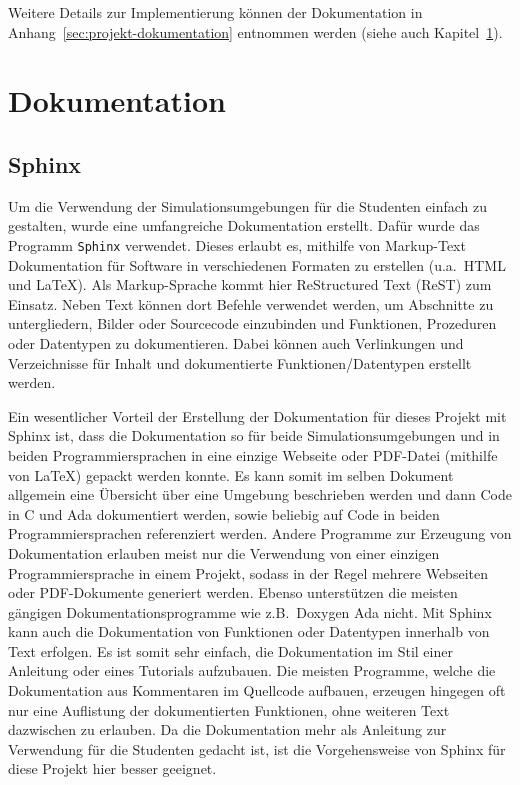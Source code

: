 \documentclass[oneside]{elaboration}
\begin{document}
Weitere Details zur Implementierung können der Dokumentation in
Anhang~\ref{sec:projekt-dokumentation} entnommen werden (siehe auch
Kapitel~\ref{sec:dokumentation}).

\section{Dokumentation}
\label{sec:dokumentation}

\subsection{Sphinx}
\label{sec:sphinx}

Um die Verwendung der Simulationsumgebungen für die Studenten einfach zu
gestalten, wurde eine umfangreiche Dokumentation erstellt. Dafür wurde das
Programm \texttt{Sphinx} verwendet. Dieses erlaubt es, mithilfe von Markup-Text
Dokumentation für Software in verschiedenen Formaten zu erstellen (u.a.\ HTML
und LaTeX). Als Markup-Sprache kommt hier ReStructured Text (ReST) zum Einsatz.
Neben Text können dort Befehle verwendet werden, um Abschnitte zu untergliedern,
Bilder oder Sourcecode einzubinden und Funktionen, Prozeduren oder Datentypen zu
dokumentieren. Dabei können auch Verlinkungen und Verzeichnisse für Inhalt und
dokumentierte Funktionen/Datentypen erstellt werden.

Ein wesentlicher Vorteil der Erstellung der Dokumentation für dieses Projekt mit
Sphinx ist, dass die Dokumentation so für beide Simulationsumgebungen und in
beiden Programmiersprachen in eine einzige Webseite oder PDF-Datei (mithilfe von
LaTeX) gepackt werden konnte. Es kann somit im selben Dokument allgemein eine
Übersicht über eine Umgebung beschrieben werden und dann Code in C und Ada
dokumentiert werden, sowie beliebig auf Code in beiden Programmiersprachen
referenziert werden. Andere Programme zur Erzeugung von Dokumentation erlauben
meist nur die Verwendung von einer einzigen Programmiersprache in einem Projekt,
sodass in der Regel mehrere Webseiten oder PDF-Dokumente generiert werden.
Ebenso unterstützen die meisten gängigen Dokumentationsprogramme wie z.B.\
Doxygen Ada nicht. Mit Sphinx kann auch die Dokumentation von Funktionen oder
Datentypen innerhalb von Text erfolgen. Es ist somit sehr einfach, die
Dokumentation im Stil einer Anleitung oder eines Tutorials aufzubauen. Die
meisten Programme, welche die Dokumentation aus Kommentaren im Quellcode
aufbauen, erzeugen hingegen oft nur eine Auflistung der dokumentierten
Funktionen, ohne weiteren Text dazwischen zu erlauben. Da die Dokumentation mehr
als Anleitung zur Verwendung für die Studenten gedacht ist, ist die
Vorgehensweise von Sphinx für diese Projekt hier besser geeignet.
\end{document}
